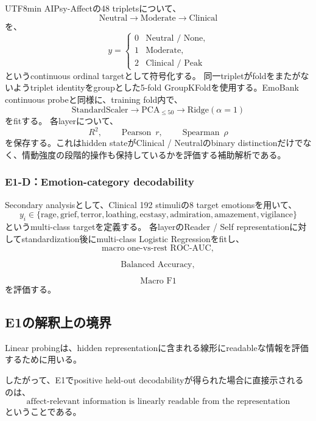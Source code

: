 \documentclass{article} %
\begin{document}
\begin{CJK*}{UTF8}{min}
AIPsy-Affectの48 tripletsについて、
\[
\text{Neutral}
\rightarrow
\text{Moderate}
\rightarrow
\text{Clinical}
\]
を、
\[
y
=
\begin{cases}
0 & \text{Neutral / None},\\
1 & \text{Moderate},\\
2 & \text{Clinical / Peak}
\end{cases}
\]
というcontinuous ordinal targetとして符号化する。
同一tripletがfoldをまたがないようtriplet identityをgroupとした5-fold GroupKFoldを使用する。EmoBank continuous probeと同様に、training fold内で、
\[
\text{StandardScaler}
\rightarrow
\text{PCA}_{\le50}
\rightarrow
\text{Ridge}(\alpha=1)
\]
をfitする。
各layerについて、
\[
R^2,
\qquad
\operatorname{Pearson}\ r,
\qquad
\operatorname{Spearman}\ \rho
\]
を保存する。これはhidden stateがClinical / Neutralのbinary distinctionだけでなく、情動強度の段階的操作も保持しているかを評価する補助解析である。


\subsubsection{E1-D：Emotion-category decodability}

Secondary analysisとして、Clinical 192 stimuliの8 target emotionsを用いて、
\[
y_i
\in
\{
\text{rage},
\text{grief},
\text{terror},
\text{loathing},
\text{ecstasy},
\text{admiration},
\text{amazement},
\text{vigilance}
\}
\]
というmulti-class targetを定義する。
各layerのReader / Self representationに対してstandardization後にmulti-class Logistic Regressionをfitし、
\[
\text{macro one-vs-rest ROC-AUC},
\]

\[
\text{Balanced Accuracy},
\]

\[
\text{Macro F1}
\]
を評価する。


\subsection{E1の解釈上の境界}

Linear probingは、hidden representationに含まれる線形にreadableな情報を評価するために用いる\citep{hewitt2019designing}。

したがって、E1でpositive held-out decodabilityが得られた場合に直接示されるのは、
\[
\text{affect-relevant information is linearly readable
from the representation}
\]
ということである。


\end{CJK*}
\end{document}
